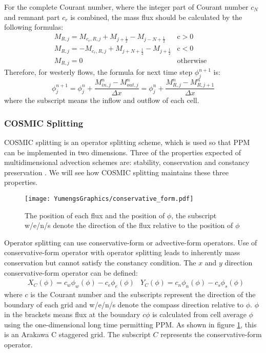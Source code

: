 For the complete Courant number, where the integer part of Courant number $c_N$ and remnant part $c_r$ is combined, the mass flux should be calculated by the following formulas:
\begin{eqnarray} \label{eq:2.11}
M_{R,j} = M_{c_r,R,j} + M_{j+\frac{1}{2}}-M_{j-N+\frac{1}{2}} & \text{c}>0 &\nonumber \\
M_{R,j} = -M_{c_r,R,j} +M_{j+N+\frac{1}{2}}- M_{j+\frac{1}{2}} & \text{c}<0 & \\
M_{R,j} = 0 & \text{otherwise} \nonumber 
\end{eqnarray}
Therefore, for westerly flows, the formula for next time step $\phi^{n+1}_j$ is: 
\begin{equation} \label{eq:2.12}
\phi^{n+1}_j = \phi^n_j + \frac{M^n_{in,j} - M^n_{out,j}}{\Delta x} = \phi^n_j + \frac{M^n_{R,j} - M^n_{R,j+1}}{\Delta x}
\end{equation}
where the subscript means the inflow and outflow of each cell.

\subsubsection{COSMIC Splitting}
\label{sec:COSMIC}

COSMIC splitting is an operator splitting scheme, which is used so that PPM can be implemented in two dimensions. Three of the properties expected of multidimensional advection schemes are: stability, conservation and constancy preservation \citep{Lin1996}. We will see how COSMIC splitting \citep{Leonard1996} maintains these three properties.
\begin{figure}
\vspace{-10pt}
\centering
\texttt{[image: YumengsGraphics/conservative\_form.pdf]}
\vspace{-10pt}
\caption{The position of each flux and the position of $\phi$, the subscript w/e/n/s denote the direction of the flux relative to the position of $\phi$ \label{fig:2.2}}
\end{figure}
Operator splitting can use conservative-form or advective-form operators. Use of conservative-form operator with operator splitting leads to inherently mass conservation but cannot satisfy the constancy condition. The $x$ and $y$ direction conservative-form operator can be defined:
\begin{eqnarray}  \label{eq:2.13}
&X_{\scriptscriptstyle C}(\phi ) = c_{w}\phi_w(\phi )-c_e\phi_e(\phi ) 
&Y_{\scriptscriptstyle C}(\phi ) = c_{n}\phi_n(\phi )-c_s\phi_s(\phi )
\end{eqnarray}
where $c$ is the Courant number and the subscripts represent the direction of the boundary of each grid and w/e/n/s denote the compass direction relative to $\phi$. $\phi $ in the brackets means flux at the boundary $c\phi$ is calculated from cell average $\phi$ using the one-dimensional long time permitting PPM. As shown in figure \ref{fig:2.2}, this is an Arakawa C staggered grid. The subscript $C$ represents the conservative-form operator.

